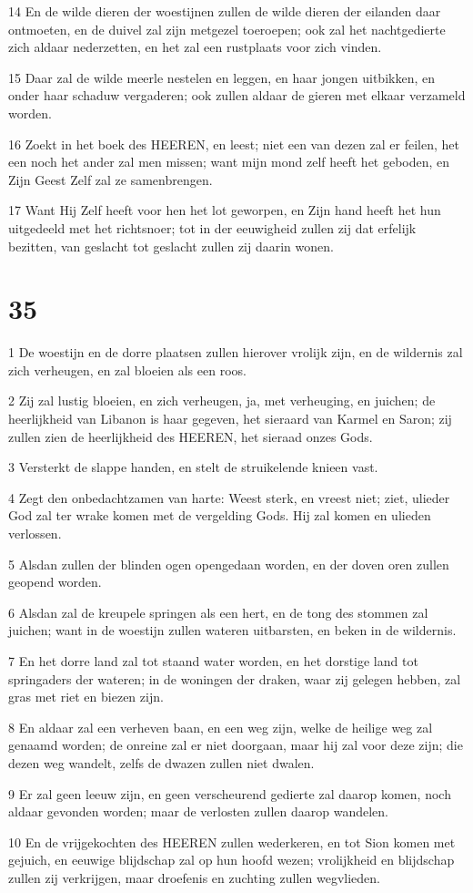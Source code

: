 \par 14 En de wilde dieren der woestijnen zullen de wilde dieren der eilanden daar ontmoeten, en de duivel zal zijn metgezel toeroepen; ook zal het nachtgedierte zich aldaar nederzetten, en het zal een rustplaats voor zich vinden.
\par 15 Daar zal de wilde meerle nestelen en leggen, en haar jongen uitbikken, en onder haar schaduw vergaderen; ook zullen aldaar de gieren met elkaar verzameld worden.
\par 16 Zoekt in het boek des HEEREN, en leest; niet een van dezen zal er feilen, het een noch het ander zal men missen; want mijn mond zelf heeft het geboden, en Zijn Geest Zelf zal ze samenbrengen.
\par 17 Want Hij Zelf heeft voor hen het lot geworpen, en Zijn hand heeft het hun uitgedeeld met het richtsnoer; tot in der eeuwigheid zullen zij dat erfelijk bezitten, van geslacht tot geslacht zullen zij daarin wonen.

\chapter{35}

\par 1 De woestijn en de dorre plaatsen zullen hierover vrolijk zijn, en de wildernis zal zich verheugen, en zal bloeien als een roos.
\par 2 Zij zal lustig bloeien, en zich verheugen, ja, met verheuging, en juichen; de heerlijkheid van Libanon is haar gegeven, het sieraard van Karmel en Saron; zij zullen zien de heerlijkheid des HEEREN, het sieraad onzes Gods.
\par 3 Versterkt de slappe handen, en stelt de struikelende knieen vast.
\par 4 Zegt den onbedachtzamen van harte: Weest sterk, en vreest niet; ziet, ulieder God zal ter wrake komen met de vergelding Gods. Hij zal komen en ulieden verlossen.
\par 5 Alsdan zullen der blinden ogen opengedaan worden, en der doven oren zullen geopend worden.
\par 6 Alsdan zal de kreupele springen als een hert, en de tong des stommen zal juichen; want in de woestijn zullen wateren uitbarsten, en beken in de wildernis.
\par 7 En het dorre land zal tot staand water worden, en het dorstige land tot springaders der wateren; in de woningen der draken, waar zij gelegen hebben, zal gras met riet en biezen zijn.
\par 8 En aldaar zal een verheven baan, en een weg zijn, welke de heilige weg zal genaamd worden; de onreine zal er niet doorgaan, maar hij zal voor deze zijn; die dezen weg wandelt, zelfs de dwazen zullen niet dwalen.
\par 9 Er zal geen leeuw zijn, en geen verscheurend gedierte zal daarop komen, noch aldaar gevonden worden; maar de verlosten zullen daarop wandelen.
\par 10 En de vrijgekochten des HEEREN zullen wederkeren, en tot Sion komen met gejuich, en eeuwige blijdschap zal op hun hoofd wezen; vrolijkheid en blijdschap zullen zij verkrijgen, maar droefenis en zuchting zullen wegvlieden.

